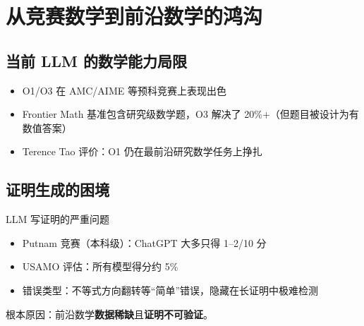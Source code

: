 \section{从竞赛数学到前沿数学的鸿沟}

\subsection{当前 LLM 的数学能力局限}

\begin{itemize}
    \item O1/O3 在 AMC/AIME 等预科竞赛上表现出色
    \item Frontier Math 基准包含研究级数学题，O3 解决了 20\%+（但题目被设计为有数值答案）
    \item Terence Tao 评价：O1 仍在最前沿研究数学任务上挣扎
\end{itemize}

\subsection{证明生成的困境}

\begin{warningbox}{LLM 写证明的严重问题}
\begin{itemize}
    \item Putnam 竞赛（本科级）：ChatGPT 大多只得 1--2/10 分
    \item USAMO 评估：所有模型得分约 5\%
    \item 错误类型：不等式方向翻转等``简单''错误，隐藏在长证明中极难检测
\end{itemize}
根本原因：前沿数学\textbf{数据稀缺}且\textbf{证明不可验证}。
\end{warningbox}

